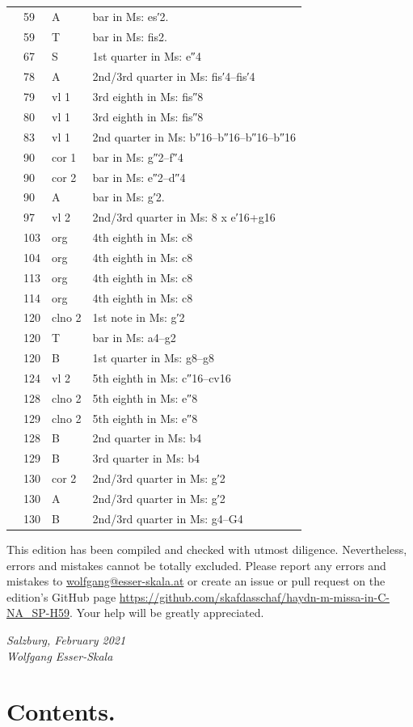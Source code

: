 \documentclass[parskip=full]{scrreprt}
\newif\iftemplate\templatetrue
\begin{document}
\begin{longtable}{lll L{10cm}}
	  & 59   & A       & bar in Ms: es′2. \\
	  & 59   & T       & bar in Ms: fis2. \\
	  & 67   & S        &1st quarter in Ms: e″4 \\
	  & 78   & A       & 2nd/3rd quarter in Ms: fis′4–fis′4 \\
	  & 79   & vl 1    & 3rd eighth in Ms: fis″8 \\
	  & 80   & vl 1    & 3rd eighth in Ms: fis″8 \\
	  & 83   & vl 1    & 2nd quarter in Ms: b″16–b″16–b″16–b″16 \\
	  & 90   & cor 1   & bar in Ms: g″2–f″4 \\
	  & 90   & cor 2   & bar in Ms: e″2–d″4 \\
	  & 90   & A       & bar in Ms: g′2. \\
	  & 97   & vl 2    & 2nd/3rd quarter in Ms: 8 x e′16+g16 \\
	  & 103  & org     & 4th eighth in Ms: c8 \\
	  & 104  & org     & 4th eighth in Ms: c8 \\
	  & 113  & org     & 4th eighth in Ms: c8 \\
	  & 114  & org     & 4th eighth in Ms: c8 \\
	  & 120  & clno 2  & 1st note in Ms: g′2 \\
	  & 120  & T       & bar in Ms: a4–g2 \\
	  & 120  & B       & 1st quarter in Ms: g8–g8 \\
	  & 124  & vl 2    & 5th eighth in Ms: c″16–cv16 \\
	  & 128  & clno 2  & 5th eighth in Ms: e″8 \\
	  & 129  & clno 2  & 5th eighth in Ms: e″8 \\
	  & 128  & B       & 2nd quarter in Ms: b4 \\
	  & 129  & B       & 3rd quarter in Ms: b4 \\
	  & 130  & cor 2   & 2nd/3rd quarter in Ms: g′2 \\
	  & 130  & A       & 2nd/3rd quarter in Ms: g′2 \\
	  & 130  & B       & 2nd/3rd quarter in Ms: g4–G4 \\
	\bottomrule
\end{longtable}


This edition has been compiled and checked with utmost diligence. Nevertheless, errors and mistakes cannot be totally excluded. Please report any errors and mistakes to \url{wolfgang@esser-skala.at} or create an issue or pull request on the edition’s GitHub page \url{https://github.com/skafdasschaf/haydn-m-missa-in-C-NA_SP-H59}. Your help will be greatly appreciated.

\bigskip
\textit{Salzburg, February 2021\\
Wolfgang Esser-Skala}

\cleardoublepage
\chapter*{Contents.}




\cleardoublepage
\fi

\iftemplate

\fi
\end{document}

